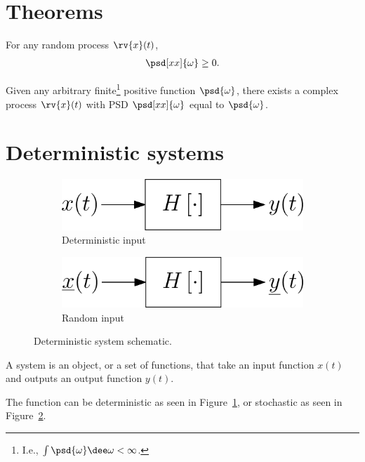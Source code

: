 \section{Theorems}
\begin{theoremBox}
     For any random process $\rv{x}(t)$, 
     \begin{align}
         \psd[xx]{\omega}\geq 0.
     \end{align}
\end{theoremBox}

\begin{theoremBox}
     Given any arbitrary finite\footnote{I.e., $\int\psd{\omega}\dee\omega<\infty$.} positive function $\psd{\omega}$, there exists a complex process $\rv{x}(t)$ with PSD $\psd[xx]{\omega}$ equal to $\psd{\omega}$.
\end{theoremBox}


\section{Deterministic systems}
\begin{figure}[H]
    \centering
    \begin{subfigure}{0.35\textwidth}
        \includegraphics[width=\textwidth]{figs/determenistic_system_det_input.eps}
        \caption{Deterministic input}
        \label{fig:determenistic_system_det_input}
    \end{subfigure}
    \hspace{1cm}
    \begin{subfigure}{0.35\textwidth}
        \includegraphics[width=\textwidth]{figs/determenistic_system_rand_input.eps}
        \caption{Random input}
        \label{fig:determenistic_system_rand_input}
    \end{subfigure}
    \caption{Deterministic system schematic.}
    \label{fig:deterministic system schematic}
\end{figure}
\begin{definitionBox}[System]
    A system is an object, or a set of functions, that take an input function $x(t)$ and outputs an output function $y(t)$. 
    
    The function can be deterministic as seen in Figure~\ref{fig:determenistic_system_det_input}, or stochastic as seen in Figure~\ref{fig:determenistic_system_rand_input}.
\end{definitionBox}

